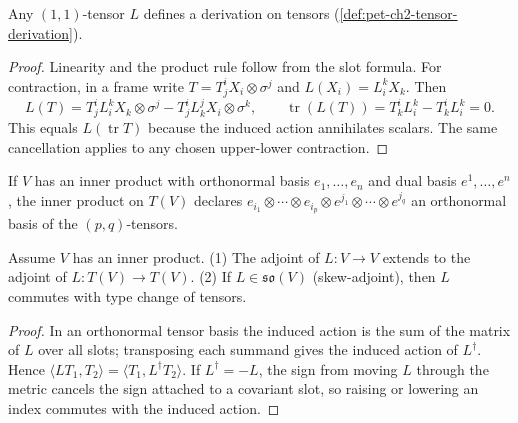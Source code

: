 \begin{proposition}
  \label{prop:pet-ch2-endomorphism-is-derivation}
  \leanok
  Any $(1,1)$-tensor $L$ defines a derivation on tensors
  (\cref{def:pet-ch2-tensor-derivation}).
\end{proposition}
\begin{proof}
  \leanok
  \sketch
  Linearity and the product
  rule follow from the slot formula. For contraction, in a frame write
  $T=T^i_jX_i\otimes\sigma^j$ and $L(X_i)=L^k_iX_k$. Then
  \[
    L(T)
      =T^i_jL^k_iX_k\otimes\sigma^j
       -T^i_jL^j_kX_i\otimes\sigma^k,
    \qquad
    \operatorname{tr}(L(T))=T^i_kL^k_i-T^i_kL^k_i=0.
  \]
  This equals $L(\operatorname{tr}T)$ because the induced action annihilates
  scalars. The same cancellation applies to any chosen upper-lower
  contraction.
\end{proof}

\begin{definition}
  \label{def:pet-ch2-tensor-algebra-inner-product}
  \leanok
  If $V$ has an inner product with orthonormal basis $e_1,\dots,e_n$ and dual
  basis $e^1,\dots,e^n$, the inner product on $T(V)$ declares
  $e_{i_1}\otimes\cdots\otimes e_{i_p}\otimes e^{j_1}\otimes\cdots\otimes e^{j_q}$
  an orthonormal basis of the $(p,q)$-tensors.
\end{definition}

\begin{proposition}
  \label{prop:pet-ch2-endomorphism-adjoint-type-change}
  \leanok
  Assume $V$ has an inner product. (1) The adjoint of $L:V\to V$ extends to
  the adjoint of $L:T(V)\to T(V)$. (2) If $L\in\mathfrak{so}(V)$ (skew-adjoint),
  then $L$ commutes with type change of tensors.
\end{proposition}
\begin{proof}
  \leanok
  \sketch
  In an orthonormal tensor
  basis the induced action is the sum of the matrix of $L$ over all slots;
  transposing each summand gives the induced action of $L^\dagger$. Hence
  $\langle LT_1,T_2\rangle=\langle T_1,L^\dagger T_2\rangle$. If
  $L^\dagger=-L$, the sign from moving $L$ through the metric cancels the
  sign attached to a covariant slot, so raising or lowering an index commutes
  with the induced action.
\end{proof}

